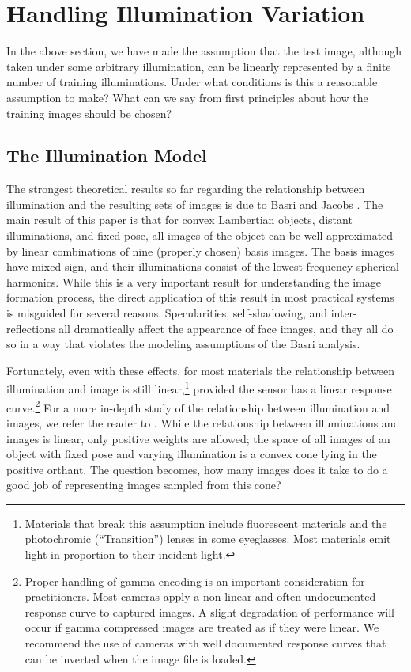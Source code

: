 \documentclass[10pt,journal,letterpaper,compsoc]{IEEEtran}
\begin{document}
\section{Handling Illumination Variation}\label{sec:illumination}
In the above section, we have made the assumption that the test image, although taken under some arbitrary illumination, can be linearly represented by a finite number of training illuminations.  Under what conditions is this a reasonable assumption to make?  What can we say from first principles about how the training images should be chosen?

\subsection{The Illumination Model}

The strongest theoretical results so far regarding the relationship
between illumination and the resulting sets of images is due to Basri and Jacobs \cite{Basri2003-PAMI}.
The main result of this paper is that for convex Lambertian objects, distant illuminations, and fixed pose,
all images of the object can be well approximated by linear combinations of
nine (properly chosen) basis images.  The basis images have mixed sign, and
their illuminations consist of the lowest frequency spherical harmonics.
While this is a very important result for understanding the image
formation process, the direct application of this result in most practical
systems is misguided for several reasons.
Specularities, self-shadowing, and inter-reflections all dramatically affect the appearance of face images,
and they all do so in a way that violates the modeling assumptions of the Basri analysis.

Fortunately, even with these effects, for most materials the relationship between
illumination and image is still linear,\footnote{Materials that break
this assumption include fluorescent materials and the photochromic (``Transition'') lenses
in some eyeglasses.  Most materials emit light in proportion to their
incident light.} provided the sensor has a linear response curve.\footnote{Proper handling of gamma encoding is an important consideration for
practitioners.  Most cameras apply a non-linear and often undocumented response
curve to captured images.  A slight degradation of performance will occur if
gamma compressed images are treated as if they were linear.  We recommend the use
of cameras with well documented response curves that can be inverted when the
image file is loaded.}
For a more in-depth study
of the relationship between illumination and images, we refer the reader to
\cite{belhumeur1998set}.
While the relationship between illuminations and images is linear,
only positive weights are allowed; the space of all images of an object with
fixed pose and varying illumination is a convex cone lying in the positive
orthant. The question becomes, how many images does it take to do a good job
of representing images sampled from this cone?
\end{document}

